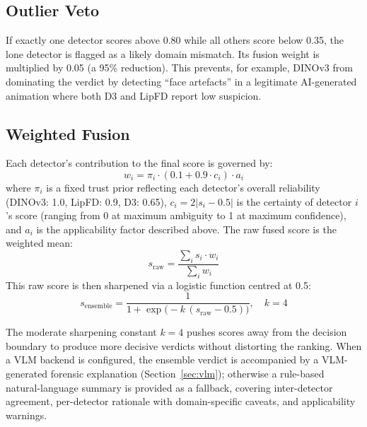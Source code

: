 \documentclass[conference]{IEEEtran}
\begin{document}
\subsection{Outlier Veto}
If exactly one detector scores above 0.80 while all others score below 0.35, the lone detector is flagged as a likely domain mismatch. Its fusion weight is multiplied by 0.05 (a 95\% reduction). This prevents, for example, DINOv3 from dominating the verdict by detecting ``face artefacts'' in a legitimate AI-generated animation where both D3 and LipFD report low suspicion.

\subsection{Weighted Fusion}
Each detector's contribution to the final score is governed by:
\begin{equation} \label{eq:fusion}
    w_i = \pi_i \cdot (0.1 + 0.9 \cdot c_i) \cdot a_i
\end{equation}
where $\pi_i$ is a fixed trust prior reflecting each detector's overall reliability (DINOv3: 1.0, LipFD: 0.9, D3: 0.65), $c_i = 2|s_i - 0.5|$ is the certainty of detector $i$'s score (ranging from 0 at maximum ambiguity to 1 at maximum confidence), and $a_i$ is the applicability factor described above. The raw fused score is the weighted mean:
\begin{equation}
    s_{\text{raw}} = \frac{\sum_i s_i \cdot w_i}{\sum_i w_i}
\end{equation}
This raw score is then sharpened via a logistic function centred at 0.5:
\begin{equation} \label{eq:sharpen}
    s_{\text{ensemble}} = \frac{1}{1 + \exp\!\bigl(-k\,(s_{\text{raw}} - 0.5)\bigr)}, \quad k = 4
\end{equation}

The moderate sharpening constant $k = 4$ pushes scores away from the decision boundary to produce more decisive verdicts without distorting the ranking. When a VLM backend is configured, the ensemble verdict is accompanied by a VLM-generated forensic explanation (Section~\ref{sec:vlm}); otherwise a rule-based natural-language summary is provided as a fallback, covering inter-detector agreement, per-detector rationale with domain-specific caveats, and applicability warnings.

\end{document}
